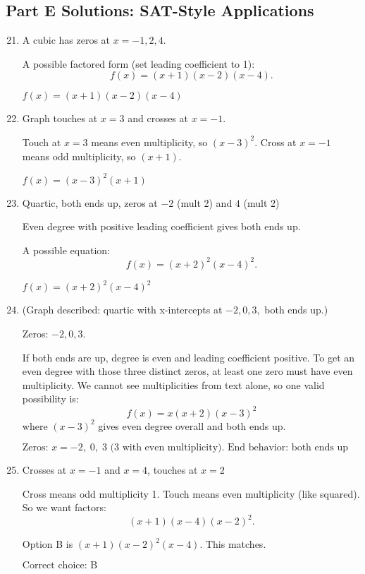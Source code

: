 \documentclass[12pt]{article}
\begin{document}
\subsection*{Part E Solutions: SAT-Style Applications}
\begin{enumerate}
  \setcounter{enumi}{20}
  \item A cubic has zeros at \(x = -1, 2, 4.\)

  A possible factored form (set leading coefficient to 1):
  \[
  f(x) = (x + 1)(x - 2)(x - 4).
  \]

  \(\boxed{f(x) = (x + 1)(x - 2)(x - 4)}\)

  \item Graph touches at \(x = 3\) and crosses at \(x = -1\).

  Touch at \(x = 3\) means even multiplicity, so \((x - 3)^2.\)  
  Cross at \(x = -1\) means odd multiplicity, so \((x + 1).\)

  \(\boxed{f(x) = (x - 3)^2(x + 1)}\)

  \item Quartic, both ends up, zeros at \(-2\) (mult 2) and \(4\) (mult 2)

  Even degree with positive leading coefficient gives both ends up.

  A possible equation:
  \[
  f(x) = (x + 2)^2(x - 4)^2.
  \]

  \(\boxed{f(x) = (x + 2)^2(x - 4)^2}\)

  \item (Graph described: quartic with x-intercepts at \(-2, 0, 3,\) both ends up.)

  Zeros: \(-2, 0, 3.\)

  If both ends are up, degree is even and leading coefficient positive.  
  To get an even degree with those three distinct zeros, at least one zero must have even multiplicity.  
  We cannot see multiplicities from text alone, so one valid possibility is:
  \[
  f(x) = x(x + 2)(x - 3)^2
  \]
  where \((x - 3)^2\) gives even degree overall and both ends up.

  \(\boxed{\text{Zeros: } x = -2,\; 0,\; 3 \text{ (3 with even multiplicity). End behavior: both ends up}}\)

  \item Crosses at \(x = -1\) and \(x = 4\), touches at \(x = 2\)

  Cross means odd multiplicity 1. Touch means even multiplicity (like squared).  
  So we want factors:
  \[
  (x + 1)(x - 4)(x - 2)^2.
  \]

  Option B is \((x + 1)(x - 2)^2(x - 4)\). This matches.

  \(\boxed{\text{Correct choice: B}}\)
\end{enumerate}
\end{document}
